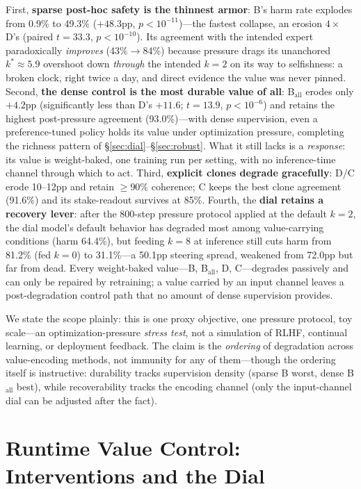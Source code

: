 \documentclass[11pt]{article}
\begin{document}
First, \textbf{sparse post-hoc safety is the thinnest armor}: B's harm rate explodes from 0.9\% to 49.3\% ($+48.3$pp, $p{<}10^{-11}$)---the fastest collapse, an erosion $4\times$ D's (paired $t{=}33.3$, $p{<}10^{-10}$). Its agreement with the intended expert paradoxically \emph{improves} (43\%$\to$84\%) because pressure drags its unanchored $k^*\!\approx\!5.9$ overshoot down \emph{through} the intended $k{=}2$ on its way to selfishness: a broken clock, right twice a day, and direct evidence the value was never pinned. Second, \textbf{the dense control is the most durable value of all}: B$_{\mathrm{all}}$ erodes only $+4.2$pp (significantly less than D's $+11.6$; $t{=}13.9$, $p{<}10^{-6}$) and retains the highest post-pressure agreement (93.0\%)---with dense supervision, even a preference-tuned policy holds its value under optimization pressure, completing the richness pattern of \S\ref{sec:dial}--\S\ref{sec:robust}. What it still lacks is a \emph{response}: its value is weight-baked, one training run per setting, with no inference-time channel through which to act. Third, \textbf{explicit clones degrade gracefully}: D/C erode 10--12pp and retain $\geq$90\% coherence; C keeps the best clone agreement (91.6\%) and its stake-readout survives at 85\%. Fourth, the \textbf{dial retains a recovery lever}: after the 800-step pressure protocol applied at the default $k{=}2$, the dial model's default behavior has degraded most among value-carrying conditions (harm 64.4\%), but feeding $k{=}8$ at inference still cuts harm from 81.2\% (fed $k{=}0$) to 31.1\%---a 50.1pp steering spread, weakened from 72.0pp but far from dead. Every weight-baked value---B, B$_{\mathrm{all}}$, D, C---degrades passively and can only be repaired by retraining; a value carried by an input channel leaves a post-degradation control path that no amount of dense supervision provides.

We state the scope plainly: this is one proxy objective, one pressure protocol, toy scale---an optimization-pressure \emph{stress test}, not a simulation of RLHF, continual learning, or deployment feedback. The claim is the \emph{ordering} of degradation across value-encoding methods, not immunity for any of them---though the ordering itself is instructive: durability tracks supervision density (sparse B worst, dense B$_{\mathrm{all}}$ best), while recoverability tracks the encoding channel (only the input-channel dial can be adjusted after the fact).

\section{Runtime Value Control: Interventions and the Dial}
\label{sec:dialruntime}
\end{document}
